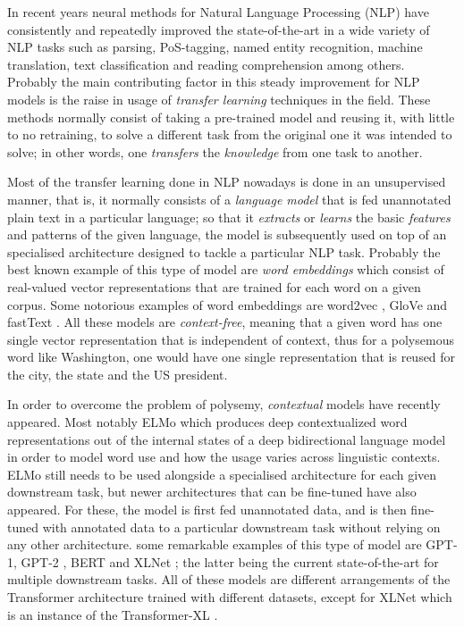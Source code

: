 In recent years neural methods for Natural Language Processing (NLP) have consistently and repeatedly improved the state-of-the-art in a wide variety of NLP tasks such as parsing, PoS-tagging, named entity recognition, machine translation, text classification and reading comprehension among others. Probably the main contributing factor in this steady improvement for NLP models is the raise in usage of \emph{transfer learning} techniques in the field. These methods normally consist of taking a pre-trained model and reusing it, with little to no retraining, to solve a different task from the original one it was intended to solve; in other words, one \emph{transfers} the \emph{knowledge} from one task to another.

Most of the transfer learning done in NLP nowadays is done in an unsupervised manner, that is, it normally consists of a  \emph{language model} that is fed unannotated plain text in a particular language; so that it \emph{extracts} or \emph{learns} the basic \emph{features} and patterns of the given language, the model is subsequently used on top of an specialised architecture designed to tackle a particular NLP task. Probably the best known example of this type of model are \emph{word embeddings} which consist of real-valued vector representations that are trained for each word on a given corpus. Some notorious examples of word embeddings are word2vec \citep{mikolov-etal-2013-distributed}, GloVe \citep{pennington-etal-2014-glove} and \mbox{fastText} \citep{mikolov-etal-2018-advances}. All these models are \emph{context-free}, meaning that a given word has one single vector representation that is independent of context, thus for a polysemous word like Washington, one would have one single representation that is reused for the city, the state and the US president.

In order to overcome the problem of polysemy, \emph{contextual} models have recently appeared. Most notably ELMo \citep{peters-etal-2018-deep} which produces deep contextualized word representations out of the internal states of a deep bidirectional language model in order to model word use and how the usage varies across linguistic contexts. ELMo still needs to be used alongside a specialised architecture for each given downstream task, but newer architectures that can be fine-tuned have also appeared. For these, the model is first fed unannotated data, and is then fine-tuned with annotated data to a particular downstream task without relying on any other architecture. some remarkable examples of this type of model are GPT-1, GPT-2 \citep{radford-etal-2018-improving,radford-etal-2019-language}, BERT \citep{devlin-etal-2019-bert} and XLNet \citep{yang-etal-2019-xlnet}; the latter being the current state-of-the-art for multiple downstream tasks. All of these models are different arrangements of the Transformer architecture \citep{vaswani-etal-2017-attention} trained with different datasets, except for XLNet which is an instance of the Transformer-XL \citep{dai-etal-2019-transformer}.

